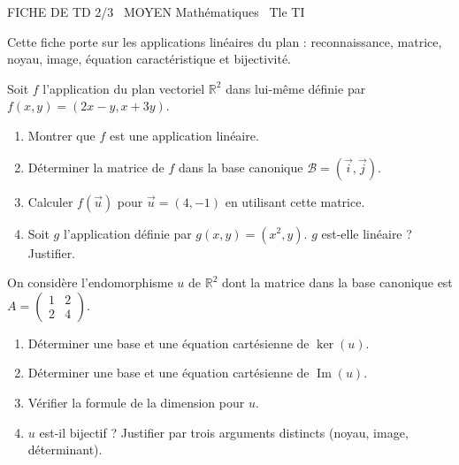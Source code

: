 \documentclass[11pt]{article}
\begin{document}
\begin{tcolorbox}[enhanced,colback=popink,colframe=popink,arc=10pt,boxrule=0pt,left=12pt,right=12pt,top=9pt,bottom=9pt]
{\color{white}\popxbold\small FICHE DE TD 2/3 \textbullet\ MOYEN \hfill Mathématiques \textbullet\ Tle TI\par}
\end{tcolorbox}
\vspace{4pt}
\noindent Cette fiche porte sur les applications linéaires du plan : reconnaissance, matrice, noyau, image, équation caractéristique et bijectivité.

\begin{exercice}
Soit $f$ l'application du plan vectoriel $\mathbb{R}^2$ dans lui-même définie par $f(x,y) = (2x - y, x + 3y)$.
\begin{enumerate}
    \item Montrer que $f$ est une application linéaire.
    \item Déterminer la matrice de $f$ dans la base canonique $\mathcal{B} = (\vec{i}, \vec{j})$.
    \item Calculer $f(\vec{u})$ pour $\vec{u} = (4, -1)$ en utilisant cette matrice.
    \item Soit $g$ l'application définie par $g(x,y) = (x^2, y)$. $g$ est-elle linéaire ? Justifier.
\end{enumerate}
\end{exercice}

\begin{exercice}
On considère l'endomorphisme $u$ de $\mathbb{R}^2$ dont la matrice dans la base canonique est $A = \begin{pmatrix} 1 & 2 \\ 2 & 4 \end{pmatrix}$.
\begin{enumerate}
    \item Déterminer une base et une équation cartésienne de $\ker(u)$.
    \item Déterminer une base et une équation cartésienne de $\operatorname{Im}(u)$.
    \item Vérifier la formule de la dimension pour $u$.
    \item $u$ est-il bijectif ? Justifier par trois arguments distincts (noyau, image, déterminant).
\end{enumerate}
\end{exercice}
\end{document}
